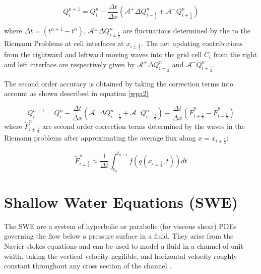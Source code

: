 \documentclass[12pt,a4paper]{article}
\begin{document}
	\begin{equation}
		Q_{i}^{n+1} =  Q_{i}^{n} - \frac{\Delta t}{\Delta x}(\mathcal{A^{+}}\Delta 	Q_{i-\frac{1}{2}}^{n} + \mathcal{A^{-}}Q_{i+\frac{1}{2}}^{n})
		\label{wpa1}
	\end{equation}
	
	\noindent where $\Delta t = (t^{n+1} - t^{n})$, $\mathcal{A^{\pm}}\Delta 	Q_{i\pm\frac{1}{2}}^{n} $ are fluctuations determined by the to the Riemann Problems at cell interfaces at $x_{i\pm\frac{1}{2}}$. The net updating contributions from the rightward and leftward moving waves into the grid cell $C_{i}$  from the right and left interface are respectively given by $\mathcal{A^{+}}\Delta 	Q_{i-\frac{1}{2}}^{n}$ and  $\mathcal{A^{-}}Q_{i+\frac{1}{2}}^{n}$\cite{ge:2008}.
	
	\noindent The second order accuracy is obtained by taking the correction terms into account as shown described in equation \eqref{wpa2}
	
	\begin{equation}
		Q_{i}^{n+1} =  Q_{i}^{n} - \frac{\Delta t}{\Delta x}(\mathcal{A^{+}}\Delta 	Q_{i-\frac{1}{2}}^{n} + \mathcal{A^{-}}Q_{i+\frac{1}{2}}^{n}) -  \frac{\Delta t}{\Delta x} (\tilde{F}_{i+\frac{1}{2}}^{n} - \tilde{F}_{i-\frac{1}{2}}^{n} )
		\label{wpa2}
	\end{equation}
	\noindent where $\tilde{F}_{i\pm\frac{1}{2}}^{n} $ are second order correction terms determined by the waves in the Riemann problems after approximating the average flux along  $x = x_{i\pm \frac{1}{2}}$:
	
	\begin{equation}
			\tilde{F}_{i\pm\frac{1}{2}}^{n} \approx \frac{1}{\Delta t} \int_{t_{n}}^{t_{n+1}} f(q(x_{i\pm\frac{1}{2}},t))dt
		\label{wpa13}
	\end{equation}

	
	\section{Shallow Water Equations (SWE)}
	The SWE are a system of hyperbolic or parabolic (for viscous shear) PDEs governing the flow below a pressure surface in a fluid. They arise from the Navier-stokes equations and can be used to model a fluid in a channel of unit width, taking the vertical velocity negilible, and horizontal velocity roughly constant throughout any cross section of the channel \cite{ge:2008}.  \\
	
\end{document}
